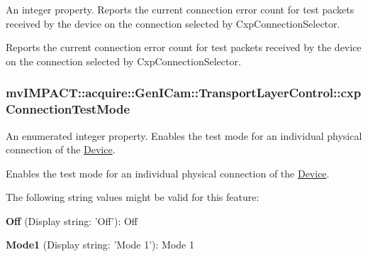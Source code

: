 An integer property. Reports the current connection error count for test packets received by the device on the connection selected by Cxp\+Connection\+Selector. 

Reports the current connection error count for test packets received by the device on the connection selected by Cxp\+Connection\+Selector. \hypertarget{classmv_i_m_p_a_c_t_1_1acquire_1_1_gen_i_cam_1_1_transport_layer_control_adb255706649959ca3e4254069faa097a}{
\subsubsection[{cxp\+Connection\+Test\+Mode}]{ mv\+I\+M\+P\+A\+C\+T\+::acquire\+::\+Gen\+I\+Cam\+::\+Transport\+Layer\+Control\+::cxp\+Connection\+Test\+Mode}}\label{classmv_i_m_p_a_c_t_1_1acquire_1_1_gen_i_cam_1_1_transport_layer_control_adb255706649959ca3e4254069faa097a}


An enumerated integer property. Enables the test mode for an individual physical connection of the \hyperlink{classmv_i_m_p_a_c_t_1_1acquire_1_1_device}{Device}. 

Enables the test mode for an individual physical connection of the \hyperlink{classmv_i_m_p_a_c_t_1_1acquire_1_1_device}{Device}.

The following string values might be valid for this feature\+:
\begin{DoxyItemize}
\item {\bfseries Off} (Display string\+: 'Off')\+: Off
\item {\bfseries Mode1} (Display string\+: 'Mode 1')\+: Mode 1
\end{DoxyItemize}

